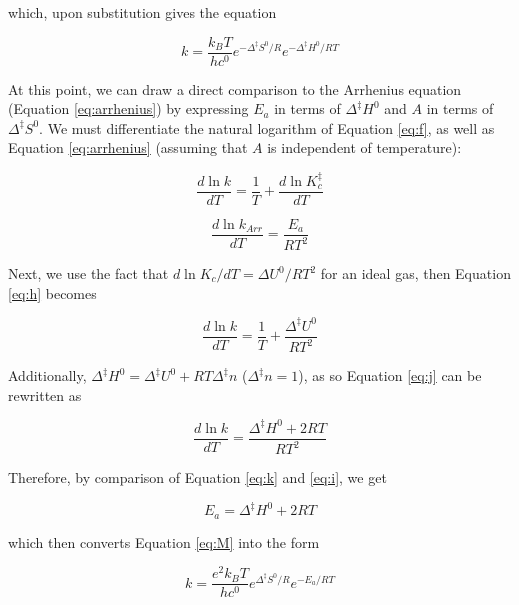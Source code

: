 \noindent which, upon substitution gives the equation

\begin{equation}
  k = \frac{k_BT}{hc^0} e^{-\Delta^\ddagger S^0/R} e^{-\Delta^\ddagger H^0/RT}
\label{eq:M}
\end{equation}

At this point, we can draw a direct comparison to the Arrhenius equation
(Equation \ref{eq:arrhenius}) by expressing $E_a$ in terms of
$\Delta^\ddagger H^0$ and $A$ in terms of $\Delta^\ddagger S^0$.  We must
differentiate the natural logarithm of Equation \ref{eq:f}, as well as Equation
\ref{eq:arrhenius} (assuming that $A$ is independent of temperature):

\begin{equation}
  \frac{d \ln k}{dT} = \frac{1}{T} + \frac{d \ln K_c^\ddagger}{dT}
  \label{eq:h}
\end{equation}

\begin{equation}
  \frac{d \ln k_{Arr}}{dT} = \frac{E_a}{RT^2}
  \label{eq:i}
\end{equation}

\noindent Next, we use the fact that $d \ln K_c / dT = \Delta U^0/RT^2$ for an
ideal gas, then Equation \ref{eq:h}  becomes

\begin{equation}
  \frac{d \ln k}{dT} = \frac{1}{T} + \frac{\Delta ^\ddagger U^0}{RT^2}
  \label{eq:j}
\end{equation}

\noindent Additionally, $\Delta ^\ddagger H^0 = \Delta ^\ddagger U^0 + RT \Delta^\ddagger
n$ ($\Delta^\ddagger n = 1$), as so Equation \ref{eq:j} can be rewritten as

\begin{equation}
  \frac{d \ln k}{dT} = \frac{\Delta ^\ddagger H^0 + 2RT}{RT^2}
  \label{eq:k}
\end{equation}

\noindent Therefore, by comparison of Equation \ref{eq:k} and \ref{eq:i}, we get

\begin{equation}
  E_a = \Delta^\ddagger H^0 + 2RT
\end{equation}

\noindent which then converts Equation \ref{eq:M} into the form

\begin{equation}
  k = \frac{e^2k_BT}{hc^0}e^{\Delta^\ddagger S^0/R}e^{-E_a/RT}
\end{equation}

